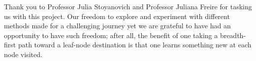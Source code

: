 \documentclass[sigconf,authordraft]{acmart}
\begin{document}



 


\begin{acks}
Thank you to Professor Julia Stoyanovich and Professor Juliana Freire for tasking us with this project. Our freedom to explore and experiment with different methods made for a challenging journey yet we are grateful to have had an opportunity to have such freedom; after all, the benefit of one taking a breadth-first path toward a leaf-node destination is that one learns something new at each node visited.
\end{acks}


    
%
\nocite{Ramaswamy:2000:EAM:342009.335437}
\nocite{Chandola:2009:ADS:1541880.1541882}
\nocite{Hua:2007:CDM:1281192.1281294}
\nocite{Ester:1996:DAD:3001460.3001507}
\end{document}
